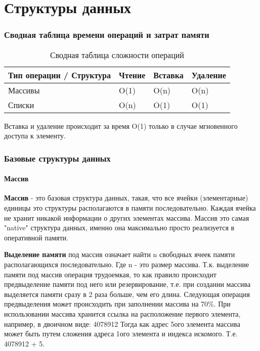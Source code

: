 \part{Структуры данных}
		\section{Сводная таблица времени операций и затрат памяти}
		
\begin{table}[h!]
\caption{Сводная таблица сложности операций}
\begin{tabular}{|l|l|l|l|}
\hline
Тип операции / Структура & Чтение & Вставка & Удаление \\ \hline
Массивы 				 & O(1)   & O(n) 	& O(n)  \\ \hline
Списки 					 & O(n)   & O(1) 	& O(1) \\ \hline
\end{tabular}
\end{table}

Вставка и удаление происходит за время O(1) только в случае мгновенного доступа к элементу.
	
		\section{Базовые структуры данных}
			\subsection{Массив}
		
			\textbf{Массив} - это базовая структура данных, такая, что все ячейки (элементарные) единицы это структуры располагаются в памяти последовательно. Каждая ячейка не хранит никакой информации о других элементах массива. Массив это самая "native" структура данных, именно она максимально просто реализуется в оперативной памяти.
			
			\textbf{Выделение памяти} под массив означает найти n свободных ячеек памяти располагающихся последовательно. Где n - это размер массива. Т.к. выделение памяти под массив операция трудоемкая, то как правило происходит предвыделение памяти под него или резервирование, т.е. при создании массива выделяется памяти сразу в 2 раза больше, чем его длина. Следующая операция предвыделения может происходить при заполнении массива на 70\%.
			При использовании массива хранится ссылка на расположение первого элемента, например, в двоичном виде: 4078912
			Тогда как адрес 5ого элемента массива может быть путем сложения адреса 1ого элемента и индекса искомого. Т.е. 4078912 + 5. 
			
